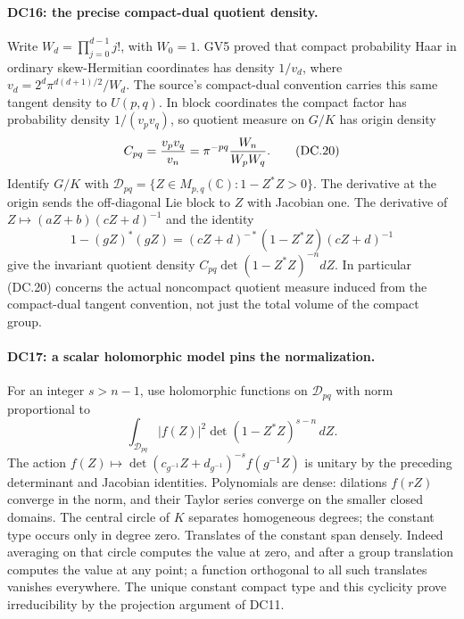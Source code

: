 \paragraph{DC16: the precise compact-dual quotient density.}
\label{claim:DC16}
Write $W_d=\prod_{j=0}^{d-1}j!$, with $W_0=1$.  GV5 proved that
compact probability Haar in ordinary skew-Hermitian coordinates
has density $1/v_d$, where $v_d=2^d\pi^{d(d+1)/2}/W_d$.
The source's compact-dual convention carries this same tangent
density to $U(p,q)$.  In block coordinates the compact factor has
probability density $1/(v_pv_q)$, so quotient measure on
$G/K$ has origin density
\[
             C_{pq}={v_pv_q\over v_n}
                    =\pi^{-pq}{W_n\over W_pW_q}.              \tag{DC.20}
\]
Identify $G/K$ with
$\mathcal D_{pq}=\{Z\in M_{p,q}(\mathbb C):1-Z^*Z>0\}$.
The derivative at the origin sends the off-diagonal Lie block
to $Z$ with Jacobian one.  The derivative of
$Z\mapsto(aZ+b)(cZ+d)^{-1}$ and the identity
\[
 1-(gZ)^*(gZ)=(cZ+d)^{-*}(1-Z^*Z)(cZ+d)^{-1}
\]
give the invariant quotient density
$C_{pq}\det(1-Z^*Z)^{-n}dZ$.
In particular (DC.20) concerns the actual noncompact quotient
measure induced from the compact-dual tangent convention, not
just the total volume of the compact group.

\paragraph{DC17: a scalar holomorphic model pins the normalization.}
\label{claim:DC17}
For an integer $s>n-1$, use holomorphic functions on $\mathcal D_{pq}$
with norm proportional to
\[
          \int_{\mathcal D_{pq}}|f(Z)|^2
                            \det(1-Z^*Z)^{s-n}\,dZ.           \tag{DC.21}
\]
The action
$f(Z)\mapsto\det(c_{g^{-1}}Z+d_{g^{-1}})^{-s}f(g^{-1}Z)$
is unitary by the preceding determinant and Jacobian identities.
Polynomials are dense: dilations $f(rZ)$ converge in the norm,
and their Taylor series converge on the smaller closed domains.
The central circle of $K$ separates homogeneous degrees; the
constant type occurs only in degree zero.  Translates of the
constant span densely.  Indeed averaging on that circle computes
the value at zero, and after a group translation computes the
value at any point; a function orthogonal to all such translates
vanishes everywhere.  The unique constant compact type and this
cyclicity prove irreducibility by the projection argument of DC11.

